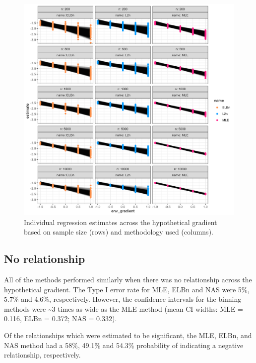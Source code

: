 \documentclass[
]{article}
\begin{document}
\begin{figure}
\centering
\includegraphics{figures/n_vary_main.png}
\caption{Individual regression estimates across the hypothetical
gradient based on sample size (rows) and methodology used (columns).}
\end{figure}

\hypertarget{no-relationship-1}{%
\subsection{No relationship}\label{no-relationship-1}}

All of the methods performed similarly when there was no relationship
across the hypothetical gradient. The Type I error rate for MLE, ELBn
and NAS were 5\%, 5.7\% and 4.6\%, respectively. However, the confidence
intervals for the binning methods were \textasciitilde3 times as wide as
the MLE method (mean CI widths: MLE = 0.116, ELBn = 0.372; NAS = 0.332).

Of the relationships which were estimated to be significant, the MLE,
ELBn, and NAS method had a 58\%, 49.1\% and 54.3\% probability of
indicating a negative relationship, respectively.
\end{document}
